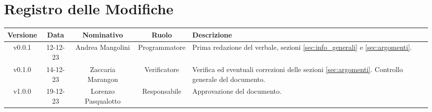 \section*{\Large Registro delle Modifiche}
    \begin{table}[h]
        \centering
        \renewcommand\tabularxcolumn[1]{m{#1}} %
        \renewcommand{\arraystretch}{1.5}
        \begin{tabularx}{0.98\textwidth}
            {c|c|c|c|>{\centering\arraybackslash}X}
            \rowcolor{black}
            \textbf{\color{white} Versione} & \textbf{\color{white} Data} & \textbf{\color{white} Nominativo} & \textbf{\color{white} Ruolo} & \textbf{\color{white} Descrizione} \\ 
            \hline

            v0.0.1 & 12-12-23 & Andrea Mangolini & Programmatore & Prima redazione del verbale, sezioni \ref{sec:info_generali} e \ref{sec:argomenti}. \\
            v0.1.0 & 14-12-23 & Zaccaria Marangon & Verificatore & Verifica ed eventuali correzioni delle sezioni \ref{sec:argomenti}. Controllo generale del documento.  \\
            v1.0.0 & 19-12-23 & Lorenzo Pasqualotto & Responsabile & Approvazione del documento.\\
            \hline
        \end{tabularx}
    \end{table}
